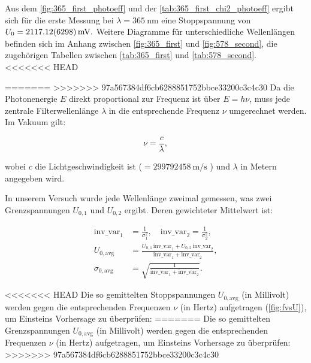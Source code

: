 \FloatBarrier
Aus dem \cref{fig:365_first_photoeff} und der \cref{tab:365_first_chi2_photoeff} ergibt sich für die erste Messung bei $\lambda = \SI{365}{\nano\meter}$ eine Stoppspannung von $U_0 = \SI{2117.12 \pm 62.98}{\milli\volt}.$ Weitere Diagramme für unterschiedliche Wellenlängen befinden sich im Anhang zwischen \cref{fig:365_first} und \cref{fig:578_second}, die zugehörigen Tabellen zwischen \cref{tab:365_first} und \cref{tab:578_second}.\\


<<<<<<< HEAD

=======
>>>>>>> 97a567384df6cb6288851752bbce33200c3c4c30
Da die Photonenergie $E$ direkt proportional zur Frequenz ist über $E = h\nu$, muss jede zentrale Filterwellenlänge $\lambda$ in die entsprechende Frequenz $\nu$ umgerechnet werden. Im Vakuum gilt:

\begin{equation}
    \nu = \frac{c}{\lambda},
\end{equation}

wobei $c$ die Lichtgeschwindigkeit ist ($= \SI{299 792 458}{\metre\per\second}$ \cite{codata}) und $\lambda$ in Metern angegeben wird.

In unserem Versuch wurde jede Wellenlänge zweimal gemessen, was zwei Grenzspannungen $U_{0,1}$ und $U_{0,2}$ ergibt. Deren gewichteter Mittelwert ist:

\begin{equation}
  \begin{aligned}
    \mathrm{inv\_var}_1 &= \frac{1}{\sigma_{1}^{2}},\quad
    \mathrm{inv\_var}_2 = \frac{1}{\sigma_{2}^{2}},\\[1ex]
    U_{0,\mathrm{avg}}  &= \frac{U_{0,1}\,\mathrm{inv\_var}_1 + U_{0,2}\,\mathrm{inv\_var}_2}
                               {\mathrm{inv\_var}_1 + \mathrm{inv\_var}_2},\\[1ex]
    \sigma_{0,\mathrm{avg}} &= \sqrt{\frac{1}{\mathrm{inv\_var}_1 + \mathrm{inv\_var}_2}}.
  \end{aligned}
\end{equation}

<<<<<<< HEAD
Die so gemittelten Stoppspannungen $U_{0,\mathrm{avg}}$ (in Millivolt) werden gegen die entsprechenden Frequenzen $\nu$ (in Hertz) aufgetragen (\cref{fig:fvsU}), um Einsteins Vorhersage zu überprüfen:
=======
Die so gemittelten Grenzspannungen $U_{0,\mathrm{avg}}$ (in Millivolt) werden gegen die entsprechenden Frequenzen $\nu$ (in Hertz) aufgetragen, um Einsteins Vorhersage zu überprüfen:
>>>>>>> 97a567384df6cb6288851752bbce33200c3c4c30

